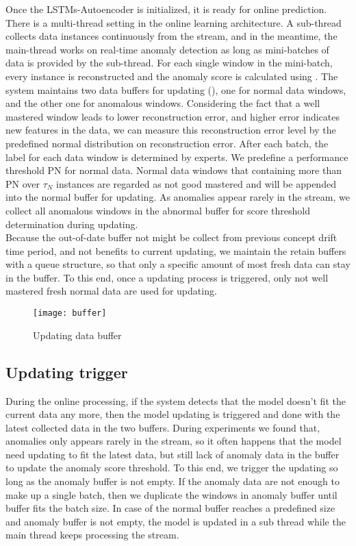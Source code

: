 Once the LSTMs-Autoencoder is initialized, it is ready for online prediction. There is a multi-thread setting in the online learning architecture. A sub-thread collects data instances continuously from the stream, and in the meantime, the main-thread works on real-time anomaly detection as long as mini-batches of data is provided by the sub-thread. For each single window in the mini-batch, every instance is reconstructed and the anomaly score is calculated using . The system maintains two data buffers for updating (), one for normal data windows, and the other one for anomalous windows. Considering the fact that a well mastered window leads to lower reconstruction error, and higher error indicates new features in the data, we can measure this reconstruction error level by the predefined normal distribution on reconstruction error. After each batch, the label for each data window is determined by experts. We predefine a performance threshold PN for normal data. Normal data windows that containing more than PN over $\tau_N$ instances are regarded as not good mastered and will be appended into the normal buffer for updating. As anomalies appear rarely in the stream, we collect all anomalous windows in the abnormal buffer for score threshold determination during updating. \\ 

Because the out-of-date buffer not might be collect from previous concept drift time period, and not benefits to current updating, we maintain the retain buffers with a queue structure, so that only a specific amount of most fresh data can stay in the buffer. To this end, once a updating process is triggered, only not well mastered fresh normal data are used for updating.


\begin{figure}[h]
\centering
\texttt{[image: buffer]}
\caption[Updating data buffer]{Updating data buffer}
\label{fig:buffer}
\end{figure}


\subsection{Updating trigger}
\label{trigger}

During the online processing, if the system detects that the model doesn’t fit the current data any more, then the model updating is triggered and done with the latest collected data in the two buffers. During experiments we found that, anomalies only appears rarely in the stream, so it often happens that the model need updating to fit the latest data, but still lack of anomaly data in the buffer to update the anomaly score threshold. To this end, we trigger the updating so long as the anomaly buffer is not empty. If the anomaly data are not enough to make up a single batch, then we duplicate the windows in anomaly buffer until buffer fits the batch size. In case of the normal buffer reaches a predefined size and anomaly buffer is not empty, the model is updated in a sub thread while the main thread keeps processing the stream.\\
 
